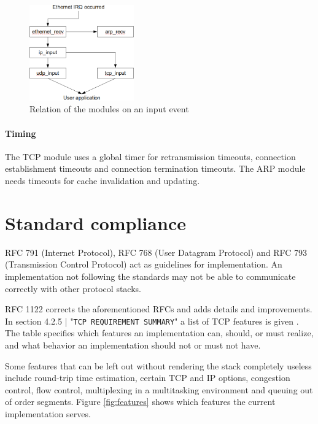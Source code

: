 \documentclass[11pt,twoside,abstract,notitlepage]{scrreprt}
\begin{document}
\begin{figure}
\caption{Relation of the modules on an input event}
\vspace{0.3cm}
\label{fig:input}
\normalsize
\centerline{\includegraphics[width=0.4\textwidth]{images/input.png}}
\end{figure}

\paragraph{Timing} The TCP module uses a global timer for retransmission timeouts, connection establishment timeouts and connection termination timeouts. The ARP module needs timeouts for cache invalidation and updating.

\section{Standard compliance}
RFC 791 \cite{rfc791}(Internet Protocol), RFC 768 \cite{rfc768} (User Datagram Protocol) and RFC 793 \cite{rfc793} (Transmission Control Protocol) act as guidelines for implementation. An implementation not following the standards may not be able to communicate correctly with other protocol stacks. 

RFC 1122  corrects the aforementioned RFCs and adds details and improvements. In section 4.2.5 | "\texttt{TCP REQUIREMENT SUMMARY}" a list of TCP features is given \cite[p. 108]{rfc1122}. The table specifies which features an implementation can, should, or must realize, and what behavior an implementation should not or must not have.  

Some features that can be left out without rendering the stack completely useless include round-trip time estimation, certain TCP and IP options, congestion control, flow control, multiplexing in a multitasking environment and queuing out of order segments. Figure \ref{fig:features} shows which features the current implementation serves. 
\end{document}
